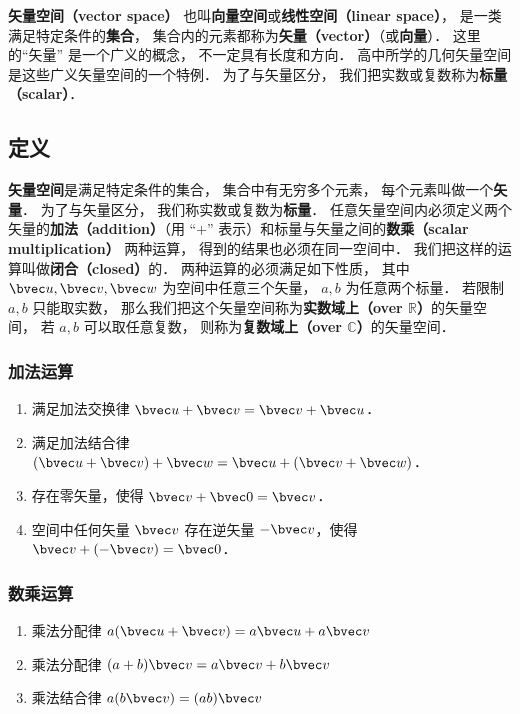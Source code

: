 

\textbf{矢量空间（vector space）} 也叫\textbf{向量空间}或\textbf{线性空间（linear space）}， 是一类满足特定条件的\textbf{集合}， 集合内的元素都称为\textbf{矢量（vector）}（或\textbf{向量}）． 这里的“矢量” 是一个广义的概念， 不一定具有长度和方向． 高中所学的几何矢量空间是这些广义矢量空间的一个特例． 为了与矢量区分， 我们把实数或复数称为\textbf{标量（scalar）}．

\subsection{定义}
\textbf{矢量空间}是满足特定条件的集合， 集合中有无穷多个元素， 每个元素叫做一个\textbf{矢量}． 为了与矢量区分， 我们称实数或复数为\textbf{标量}． 任意矢量空间内必须定义两个矢量的\textbf{加法（addition）}（用 “+” 表示）和标量与矢量之间的\textbf{数乘（scalar multiplication）} 两种运算， 得到的结果也必须在同一空间中． 我们把这样的运算叫做\textbf{闭合（closed）}的． 两种运算的必须满足如下性质， 其中 $\bvec u,\bvec v,\bvec w$ 为空间中任意三个矢量， $a,b$ 为任意两个标量． 若限制 $a, b$ 只能取实数， 那么我们把这个矢量空间称为\textbf{实数域上（over $\mathbb R$）}的矢量空间， 若 $a, b$ 可以取任意复数， 则称为\textbf{复数域上（over $\mathbb C$）}的矢量空间．

\subsubsection{加法运算}
\begin{enumerate}
\item 满足加法交换律 $\bvec u + \bvec v = \bvec v + \bvec u$．
\item 满足加法结合律 $(\bvec u + \bvec v) + \bvec w = \bvec u + (\bvec v + \bvec w)$．
\item 存在零矢量，使得 $\bvec v + \bvec 0 = \bvec v$．
\item 空间中任何矢量 $\bvec v$ 存在逆矢量 $-\bvec v$，使得 $\bvec v + (-\bvec v) = \bvec 0$．
\end{enumerate}

\subsubsection{数乘运算}
\begin{enumerate}
\item 乘法分配律 $a(\bvec u + \bvec v) = a\bvec u + a\bvec v$ 
\item 乘法分配律 $(a + b)\bvec v = a\bvec v + b\bvec v$
\item 乘法结合律 $a (b \bvec v) = (ab) \bvec v$
\end{enumerate}


